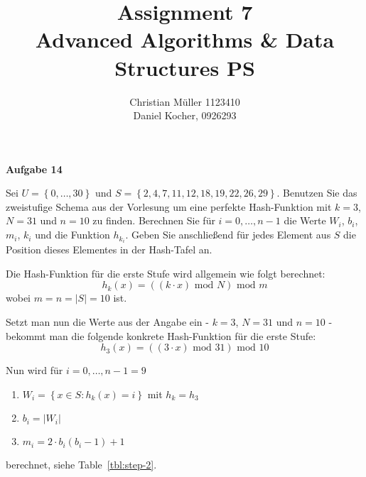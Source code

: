 \documentclass{article}
\begin{document}
\title{Assignment 7 \\ Advanced Algorithms \& Data Structures PS}%
\author{Christian Müller 1123410 \\ Daniel Kocher, 0926293}%
\maketitle

{\bfseries Aufgabe 14}%

Sei $U = \left\{ 0, \ldots, 30 \right\}$ und
$S = \left\{ 2, 4, 7, 11, 12, 18, 19, 22, 26, 29 \right\}$. Benutzen Sie das
zweistufige Schema aus der Vorlesung um eine perfekte Hash-Funktion mit $k = 3$,
$N = 31$ und $n = 10$ zu finden. Berechnen Sie f{\"u}r $i = 0, \ldots, n - 1$ die
Werte $W_i$, $b_i$, $m_i$, $k_i$ und die Funktion $h_{k_i}$. Geben Sie
anschlie{\ss}end f{\"u}r jedes Element aus $S$ die Position dieses Elementes in
der Hash-Tafel an.

Die Hash-Funktion f{\"u}r die erste Stufe wird allgemein wie folgt berechnet:
\begin{equation}
  h_k \left( x \right) = \left( \left( k \cdot x \right)\text{ mod }N \right)\text{ mod }m
\end{equation}
wobei $m = n = |S| = 10$ ist.

Setzt man nun die Werte aus der Angabe ein - $k = 3$, $N = 31$ und $n = 10$ -
bekommt man die folgende konkrete Hash-Funktion f{\"u}r die erste Stufe:
\begin{equation}
  h_3 \left( x \right) = \left( \left( 3 \cdot x \right)\text{ mod }31 \right)\text{ mod }10
  \label{eq:hk}
\end{equation}

Nun wird f{\"u}r $i = 0, \ldots, n - 1 = 9$
\parskip0pt\begin{enumerate}
  \item $W_i = \left\{ x \in S: h_k \left( x \right) = i \right\}$ mit $h_k = h_3$
  \item $b_i = | W_i |$
  \item $m_i = 2 \cdot b_i \left( b_i - 1 \right) + 1$
\end{enumerate}
berechnet, siehe Table~\ref{tbl:step-2}.
\end{document}
